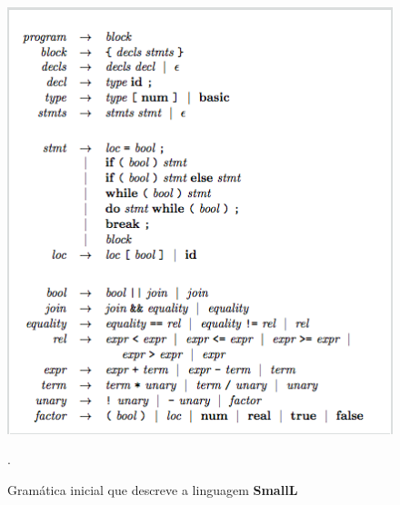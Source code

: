 \begin{figure}[H]
 	\centering
	\includegraphics[width=1\textwidth]{imgs/grammar.png}
	\caption{Gramática inicial que descreve a linguagem \textbf{SmallL}}.
	\label{fig:grammar}
\end{figure}